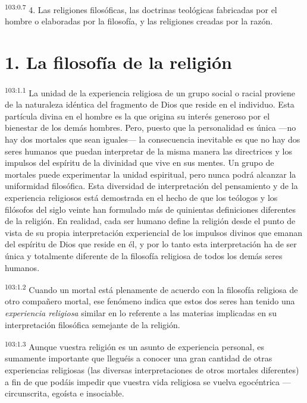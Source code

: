 \par
\textsuperscript{103:0.7} 4. Las religiones filosóficas, las doctrinas teológicas fabricadas por el hombre o elaboradas por la filosofía, y las religiones creadas por la razón.

\section*{1. La filosofía de la religión}
\par
\textsuperscript{103:1.1} La unidad de la experiencia religiosa de un grupo social o racial proviene de la naturaleza idéntica del fragmento de Dios que reside en el individuo. Esta partícula divina en el hombre es la que origina su interés generoso por el bienestar de los demás hombres. Pero, puesto que la personalidad es única ---no hay dos mortales que sean iguales--- la consecuencia inevitable es que no hay dos seres humanos que puedan interpretar de la misma manera las directrices y los impulsos del espíritu de la divinidad que vive en sus mentes. Un grupo de mortales puede experimentar la unidad espiritual, pero nunca podrá alcanzar la uniformidad filosófica. Esta diversidad de interpretación del pensamiento y de la experiencia religiosos está demostrada en el hecho de que los teólogos y los filósofos del siglo veinte han formulado más de quinientas definiciones diferentes de la religión. En realidad, cada ser humano define la religión desde el punto de vista de su propia interpretación experiencial de los impulsos divinos que emanan del espíritu de Dios que reside en él, y por lo tanto esta interpretación ha de ser única y totalmente diferente de la filosofía religiosa de todos los demás seres humanos.

\par
\textsuperscript{103:1.2} Cuando un mortal está plenamente de acuerdo con la filosofía religiosa de otro compañero mortal, ese fenómeno indica que estos dos seres han tenido una \textit{experiencia religiosa} similar en lo referente a las materias implicadas en su interpretación filosófica semejante de la religión.

\par
\textsuperscript{103:1.3} Aunque vuestra religión es un asunto de experiencia personal, es sumamente importante que lleguéis a conocer una gran cantidad de otras experiencias religiosas (las diversas interpretaciones de otros mortales diferentes) a fin de que podáis impedir que vuestra vida religiosa se vuelva egocéntrica --- circunscrita, egoísta e insociable.

